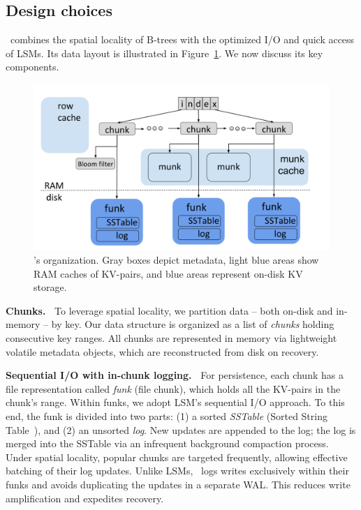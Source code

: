 \subsection{Design choices}

\sys\ combines the spatial locality of B-trees with the optimized I/O and quick access of LSMs. 
Its data layout is illustrated in Figure~\ref{fig:piwi}.  We now discuss its key components.   

\begin{figure}[tb]
\includegraphics[width=\columnwidth]{PiWi.png}
\caption{\sys's  organization. Gray boxes depict metadata, light blue areas show RAM caches of KV-pairs, and blue areas represent on-disk KV storage.}
\label{fig:piwi}
\end{figure}


{\bf Chunks.\ }
To leverage spatial locality, we partition data -- both on-disk and in-memory -- by key.
Our  data structure is organized as a 
list of \emph{chunks} holding consecutive key ranges. 
All chunks are represented in memory via lightweight volatile metadata objects, which are reconstructed from disk on recovery.

{\bf Sequential I/O with in-chunk logging.\ }
For persistence, each chunk has a file representation called  \emph{funk} (file chunk), which holds all the KV-pairs in the chunk's range.
Within funks, we adopt LSM's sequential I/O approach. To this end, the funk 
is divided into two parts: (1) a sorted \emph{SSTable} (Sorted String Table~\cite{Bigtable2008}), and (2) an unsorted \emph{log}. 
New updates are appended to the log; the log is  merged into the SSTable via an infrequent background compaction process. 
Under spatial locality,  popular chunks are targeted frequently, allowing effective batching of their log updates. 
Unlike LSMs, \sys\ logs writes exclusively within their funks and avoids duplicating the updates  in a separate WAL. This reduces write amplification and expedites recovery. 

